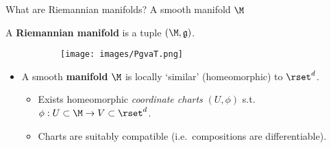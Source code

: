    \begin{frame}{What are Riemannian manifolds? A smooth manifold $\M$}
   
   A \textbf{Riemannian manifold} is a tuple $(\M, \mathfrak{g})$.
   
   \begin{figure}
       \centering
       \begin{subfigure}[t]{0.45\textwidth}
           \texttt{[image: images/PgvaT.png]}
       \end{subfigure}
   \end{figure}
   
   \begin{itemize} [triangle]
       \item A smooth \textbf{manifold} $\M$ is locally `similar' (homeomorphic) to $\rset^d$.
        \begin{itemize} [circle]
           \item Exists homeomorphic \textit{coordinate charts} $(U, \phi)$ s.t.\ $\phi: U \subset \M \to V \subset \rset^d$.
           \item Charts are suitably compatible (i.e.\ compositions are differentiable).
       \end{itemize}
   \end{itemize}
   
   \end{frame}
   
